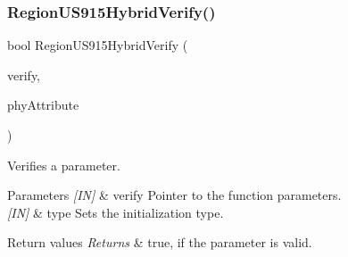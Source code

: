 \subsubsection{\texorpdfstring{Region\+U\+S915\+Hybrid\+Verify()}{RegionUS915HybridVerify()}}
{\footnotesize\ttfamily bool Region\+U\+S915\+Hybrid\+Verify (\begin{DoxyParamCaption}\item[{\hyperlink{group__REGION_ga966d97bc2f25df1c09e92e60ef652276}{Verify\+Params\+\_\+t} $\ast$}]{verify,  }\item[{\hyperlink{group__REGION_ga9445b07fdf77581ecfaf389970e635f8}{Phy\+Attribute\+\_\+t}}]{phy\+Attribute }\end{DoxyParamCaption})}



Verifies a parameter. 


\begin{DoxyParams}{Parameters}
{\em \mbox{[}\+I\+N\mbox{]}} & verify Pointer to the function parameters.\\
\hline
{\em \mbox{[}\+I\+N\mbox{]}} & type Sets the initialization type.\\
\hline
\end{DoxyParams}

\begin{DoxyRetVals}{Return values}
{\em Returns} & true, if the parameter is valid. \\
\hline
\end{DoxyRetVals}
